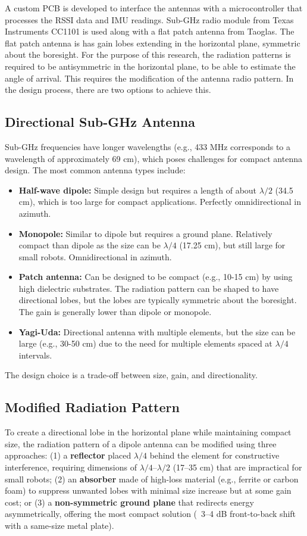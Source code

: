 \documentclass[subscriptcorrection,upint,varvw,barcolor=Goldenrod3,mathalfa=cal=euler,balance,hyphenate,pdf-a]{asmejour}
\begin{document}
A custom PCB is developed to interface the antennas with a microcontroller that processes the RSSI data and IMU readings. Sub-GHz radio module from Texas Instruments CC1101 is used along with a flat patch antenna from Taoglas. The flat patch antenna is has gain lobes extending in the horizontal plane, symmetric about the boresight. For the purpose of this research, the radiation patterns is required to be antisymmetric in the horizontal plane, to be able to estimate the angle of arrival. This requires the modification of the antenna radio pattern. In the design process, there are two options to achieve this.

\subsection{Directional Sub-GHz Antenna}
Sub-GHz frequencies have longer wavelengths (e.g., 433 MHz corresponds to a wavelength of approximately 69 cm), which poses challenges for compact antenna design. The most common antenna types include:
\begin{itemize}
\item \textbf{Half-wave dipole:} Simple design but requires a length of about $\lambda/2$ (34.5 cm), which is too large for compact applications. Perfectly omnidirectional in azimuth.
\item \textbf{Monopole:} Similar to dipole but requires a ground plane. Relatively compact than dipole as the size can be $\lambda/4$ (17.25 cm), but still large for small robots. Omnidirectional in azimuth.
\item \textbf{Patch antenna:} Can be designed to be compact (e.g., 10-15 cm) by using high dielectric substrates. The radiation pattern can be shaped to have directional lobes, but the lobes are typically symmetric about the boresight. The gain is generally lower than dipole or monopole.
\item \textbf{Yagi-Uda:} Directional antenna with multiple elements, but the size can be large (e.g., 30-50 cm) due to the need for multiple elements spaced at $\lambda/4$ intervals.
\end{itemize}
The design choice is a trade-off between size, gain, and directionality.

\subsection{Modified Radiation Pattern}
To create a directional lobe in the horizontal plane while maintaining compact size, the radiation pattern of a dipole antenna can be modified using three approaches: (1) a \textbf{reflector} placed $\lambda/4$ behind the element for constructive interference, requiring dimensions of $\lambda/4$--$\lambda/2$ (17--35 cm) that are impractical for small robots; (2) an \textbf{absorber} made of high-loss material (e.g., ferrite or carbon foam) to suppress unwanted lobes with minimal size increase but at some gain cost; or (3) a \textbf{non-symmetric ground plane} that redirects energy asymmetrically, offering the most compact solution (~3--4 dB front-to-back shift with a same-size metal plate).
\end{document}
